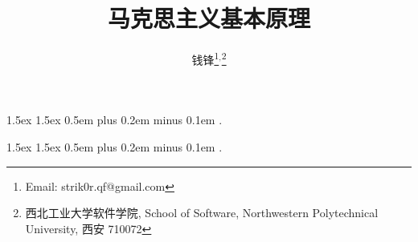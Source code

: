 \documentclass[10pt, UTF8]{book} %
\title{\textbf{马克思主义基本原理}}
\author{钱锋\thanks{Email: strik0r.qf@gmail.com}${}^,$\thanks{
    西北工业大学软件学院, School of Software, Northwestern Polytechnical University, 西安 710072
}}
\begin{document}
    {1.5ex}                                         %
    {1.5ex}                                         %
    {}                                              %
    {}                                              %
    {\bfseries}                                     %
    {}                                              %
    {0.5em plus 0.2em minus 0.1em}                  %
    {.}

\theoremstyle{mytheoremstyle} \newtheorem{example}{例}[section]
\theoremstyle{mytheoremstyle} \newtheorem{key}{核心要点}[section]

\theoremstyle{plain} \newtheorem{thm}{分析论述}

    {1.5ex}                                         %
    {1.5ex}                                         %
    {}                                              %
    {}                                              %
    {\kaishu}                                       %
    {}                                              %
    {0.5em plus 0.2em minus 0.1em}                  %
    {.}

\theoremstyle{my3theoremstyle}
\newtheorem*{remark}{注}
\newtheorem*{sol}{答案要点}
\newtheorem*{cmt}{评注}
\end{document}

